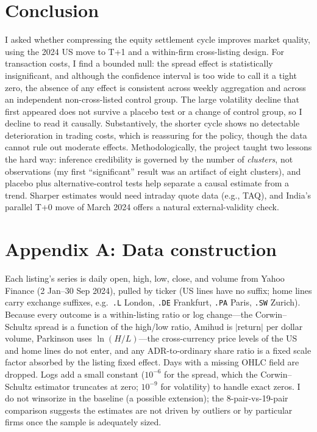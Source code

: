 \documentclass[11pt]{article}
\begin{document}
\section{Conclusion}
I asked whether compressing the equity settlement cycle improves market quality,
using the 2024 US move to T+1 and a within-firm cross-listing design. For transaction costs, I find a bounded null: the spread effect is
statistically insignificant, and although the confidence interval is too wide to
call it a tight zero, the absence of any effect is consistent across weekly
aggregation and across an independent non-cross-listed control group. The large
volatility decline that first appeared does not survive a placebo test or a change
of control group, so I decline to read it causally. Substantively, the shorter cycle shows no detectable deterioration in trading costs, which is reassuring for the policy, though the data cannot rule out moderate effects. Methodologically, the
project taught two lessons the hard way: inference credibility is governed by the
number of \emph{clusters}, not observations (my first ``significant'' result was an
artifact of eight clusters), and placebo plus alternative-control tests help separate a causal estimate from a trend. Sharper estimates would need intraday quote data (e.g., TAQ), and India's parallel T+0 move of March 2024 offers a natural external-validity check.

\appendix
\section*{Appendix A: Data construction}
Each listing's series is daily open, high, low, close, and volume from Yahoo
Finance (2 Jan--30 Sep 2024), pulled by ticker (US lines have no suffix; home
lines carry exchange suffixes, e.g.\ \texttt{.L} London, \texttt{.DE} Frankfurt,
\texttt{.PA} Paris, \texttt{.SW} Zurich). Because every outcome is a within-listing ratio or log change---the Corwin--Schultz spread is a function of the
high/low ratio, Amihud is $|$return$|$ per dollar volume, Parkinson uses
$\ln(H/L)$---the cross-currency price levels of the US and home lines do not enter,
and any ADR-to-ordinary share ratio is a fixed scale factor absorbed by the listing
fixed effect. Days with a missing OHLC field are dropped. Logs add a small constant
($10^{-6}$ for the spread, which the Corwin--Schultz estimator truncates at zero;
$10^{-9}$ for volatility) to handle exact zeros. I do not winsorize in the baseline (a possible extension); the 8-pair-vs-19-pair comparison suggests the estimates are not driven by outliers or by particular firms once the sample is adequately sized.
\end{document}
